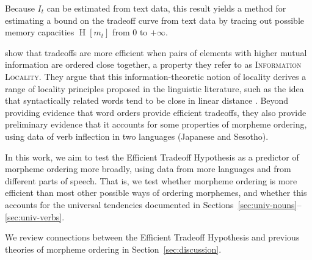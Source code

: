 \documentclass[11pt,letterpaper]{article}
\newcommand{\citep}{\parencite}
\newcommand{\citet}{\Textcite}
\newcommand\becky[1]{{\color{blue}(#1)}}
\newcommand{\jd}[1]{\textcolor{Pink}{[jd: #1]}}
\newcounter{theorem}
\begin{document}
Because $I_t$ can be estimated from text data, this result yields a method for estimating a bound on the tradeoff curve from text data by tracing out possible memory capacities $\operatorname{H}[m_t]$ from $0$ to $+\infty$.


\citet{Hahn2020modeling} show that tradeoffs are more efficient when pairs of elements with higher mutual information are ordered close together, a property they refer to as \textsc{Information Locality}.
They argue that this information-theoretic notion of locality derives a range of locality principles proposed in the linguistic literature, such as the idea that syntactically related words tend to be close in linear distance \citep{rijkhoff-word-1986, hawkins1994performance, futrell-cross-linguistic-2015, liu-dependency-2017, temperley-minimizing-2018}.
Beyond providing evidence that word orders provide efficient tradeoffs, they also provide preliminary evidence that it accounts for some properties of morpheme ordering, using data of verb inflection in two languages (Japanese and Sesotho).

In this work, we aim to test the Efficient Tradeoff Hypothesis as a predictor of morpheme ordering more broadly, using data from more languages and from different parts of speech.
That is, we test whether morpheme ordering is more efficient than most other possible ways of ordering morphemes, and whether this accounts for the universal tendencies documented in Sections~\ref{sec:univ-nouns}--\ref{sec:univ-verbs}.

We review connections between the Efficient Tradeoff Hypothesis and previous theories of morpheme ordering in Section~\ref{sec:discussion}.




\end{document}
